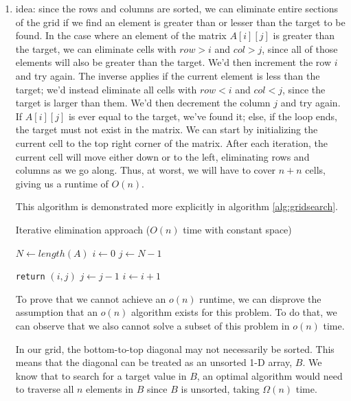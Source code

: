 \documentclass[12pt]{article}
\begin{document}
\begin{enumerate}
    \item idea: since the rows and columns are sorted, we can eliminate entire sections of the grid if we find an element 
    is greater than or lesser than the target to be found. In the case where an element of the matrix $A[i][j]$ is greater 
    than the target, we can eliminate cells with $row > i$ and $col > j$, since 
    all of those elements will also be greater than the target. We'd then increment the row $i$ and try again. The inverse 
    applies if the current element is less than the target; we'd instead eliminate all cells with $row < i$ and $col < j$, 
    since the target is larger than them. We'd then decrement the column $j$ and try again. If $A[i][j]$ is ever equal to 
    the target, we've found it; else, if the loop ends, the target must not exist in the matrix. We can start by initializing 
    the current cell to the top right corner of the matrix. After each iteration, the current cell will move either 
    down or to the left, eliminating rows and columns as we go along. Thus, at worst, we will have to cover $n + n$ cells, 
    giving us a runtime of $O(n)$.
    
    This algorithm is demonstrated more explicitly in algorithm \ref{alg:gridsearch}.
    
    \begin{algorithm}
        \caption{Iterative elimination approach ($O(n)$ time with constant space)}\label{alg:gridsearch}
        \begin{algorithmic}
            \State $N \gets length(A)$
            \State $i \gets 0$
            \State $j \gets N - 1$
            
                    \State \texttt{return} $(i, j)$
                \Else
                        \State $j \gets j - 1$
                    \Else
                        \State $i \gets i + 1$
                    \EndIf
                \EndIf
            \EndWhile
        \end{algorithmic}
    \end{algorithm}

    To prove that we cannot achieve an $o(n)$ runtime, we can disprove the assumption that an $o(n)$ algorithm exists for 
    this problem. To do that, we can observe that we also cannot solve a subset of this problem in $o(n)$ time. 

    In our grid, the bottom-to-top diagonal may not necessarily be sorted. This means that the diagonal 
    can be treated as an unsorted 1-D array, $B$. We know that to search for a target value in $B$, an optimal algorithm 
    would need to traverse all $n$ elements in $B$ since $B$ is unsorted, taking $\Omega(n)$ time.


\end{enumerate}
\end{document}
